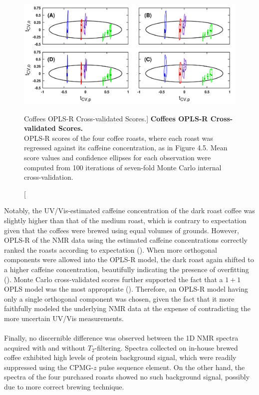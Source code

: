 \begin{figure}[H]
\includegraphics[width=6in]{figs/apps/06-oplsr-tcv.png}
\caption
      [Coffees OPLS-R Cross-validated Scores.]{
  {\bf Coffees OPLS-R Cross-validated Scores.}
  \\
  OPLS-R scores of the four coffee roasts, where each roast was regressed
  against its caffeine concentration, as in Figure 4.5. Mean score values
  and confidence ellipses for each observation were computed from 100
  iterations of seven-fold Monte Carlo internal cross-validation.
}
\label{figure.4.6}
\end{figure}

\begin{doublespace}
Notably, the UV/Vis-estimated caffeine concentration of the dark roast coffee
was slightly higher than that of the medium roast, which is contrary to
expectation given that the coffees were brewed using equal volumes of
grounds. However, OPLS-R of the NMR data using the estimated caffeine
concentrations correctly ranked the roasts according to expectation
(). When more orthogonal components were allowed
into the OPLS-R model, the dark roast again shifted to a higher caffeine
concentration, beautifully indicating the presence of overfitting
(). Monte Carlo cross-validated scores further
supported the fact that a $1+1$ OPLS model was the most appropriate
(). Therefore, an OPLS-R model having only a single
orthogonal component was chosen, given the fact that it more faithfully
modeled the underlying NMR data at the expense of contradicting the more
uncertain UV/Vis measurements.
\\\\
Finally, no discernible difference was observed between the 1D \hnmr{} NMR
spectra acquired with and without $T_2$-filtering. Spectra collected on
in-house brewed coffee exhibited high levels of protein background signal,
which were readily suppressed using the CPMG-$z$ pulse sequence element. On
the other hand, the spectra of the four purchased roasts showed no such
background signal, possibly due to more correct brewing technique.
\end{doublespace}

